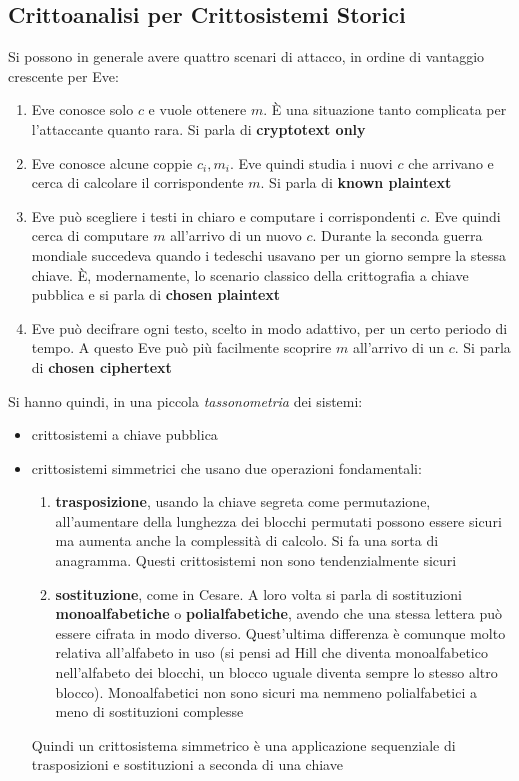 \documentclass[a4paper,12pt, oneside]{book}
\begin{document}
\subsection{Crittoanalisi per Crittosistemi Storici}
Si possono in generale avere quattro scenari di attacco, in ordine di vantaggio
crescente per Eve:
\begin{enumerate}
  \item Eve conosce solo $c$ e vuole ottenere $m$. È una situazione tanto
  complicata per l'attaccante quanto rara. Si parla di \textbf{cryptotext only}
  \item Eve conosce alcune coppie $c_i,m_i$. Eve quindi studia i nuovi $c$ che
  arrivano e cerca di calcolare il corrispondente $m$. Si parla di \textbf{known
  plaintext}
  \item Eve può scegliere i testi in chiaro e computare i corrispondenti
  $c$. Eve quindi cerca di computare $m$ all'arrivo di un nuovo $c$. Durante la
  seconda guerra mondiale succedeva quando i tedeschi usavano per un giorno
  sempre la stessa chiave. È, modernamente, lo
  scenario classico della crittografia a chiave pubblica e si parla di
  \textbf{chosen plaintext} 
  \item Eve può decifrare ogni testo, scelto in modo adattivo, per un certo
  periodo di tempo. A questo Eve può più facilmente scoprire $m$ all'arrivo di
  un $c$. Si parla di \textbf{chosen ciphertext} 
\end{enumerate}
Si hanno quindi, in una piccola \textit{tassonometria} dei sistemi:
\begin{itemize}
  \item crittosistemi a chiave pubblica
  \item crittosistemi simmetrici che usano due operazioni fondamentali:
  \begin{enumerate}
    \item \textbf{trasposizione}, usando la chiave segreta come permutazione,
    all'aumentare della lunghezza dei blocchi permutati possono essere sicuri ma
    aumenta anche la complessità di calcolo. Si fa una sorta di
    anagramma. Questi crittosistemi non sono tendenzialmente sicuri
    \item \textbf{sostituzione}, come in Cesare. A loro volta si parla di
    sostituzioni \textbf{monoalfabetiche} o \textbf{polialfabetiche}, avendo che
    una stessa lettera può essere cifrata in modo diverso. Quest'ultima
    differenza è comunque molto relativa all'alfabeto in uso (si pensi ad Hill
    che diventa monoalfabetico nell'alfabeto dei blocchi, un blocco uguale
    diventa sempre lo stesso altro blocco). Monoalfabetici non sono sicuri ma
    nemmeno polialfabetici a meno di sostituzioni complesse
  \end{enumerate}
  Quindi un crittosistema simmetrico è una applicazione sequenziale di
  trasposizioni e sostituzioni a seconda di una chiave
\end{itemize}
\end{document}
